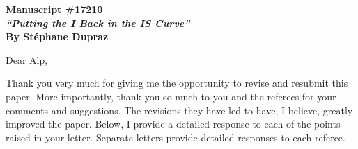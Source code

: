 \documentclass[11pt]{article}
\begin{document}
\setlength{\headheight}{25pt}
\pagestyle{fancy}
\lfoot{}
\cfoot{\thepage}
\rfoot{}
\renewcommand{\headrulewidth}{0.5pt}
\renewcommand{\footrulewidth}{0.0pt}

\noindent \textbf{Manuscript \#17210}\\
\noindent  \textbf{\emph{``Putting the I Back in the IS Curve''}}\\
\textbf{By St\'ephane Dupraz}

\singlespacing

\bigskip
\bigskip

\noindent Dear Alp,

\bigskip
\medskip

\noindent Thank you very much for giving me the opportunity to revise and resubmit this paper. More importantly, thank you so much to you and the referees for your comments and suggestions. The revisions they have led to have, I believe, greatly improved the paper. Below, I provide a detailed response to each of the points raised in your letter. Separate letters provide detailed responses to each referee.\\

\bigskip
\end{document}
